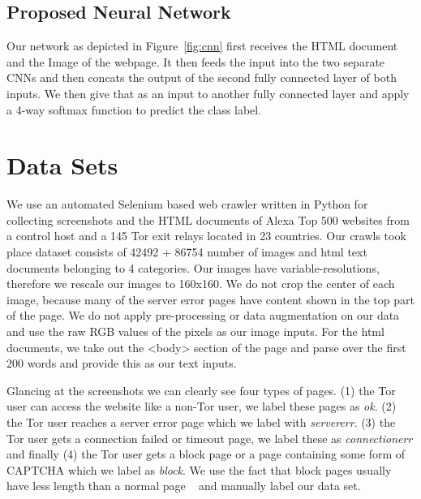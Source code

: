 \documentclass{article} %
\begin{document}
\subsection{Proposed Neural Network}
Our network as depicted in Figure~\ref{fig:cnn} first receives the HTML document and the Image of the webpage. It then feeds the input into the two separate CNNs and then concats the output of the second fully connected layer of both inputs. We then give that as an input to another fully connected layer and apply a 4-way softmax function to predict the class label.

\section{Data Sets}  \label{datasets}
We use an automated Selenium based web crawler written in Python for collecting screenshots and the HTML documents of Alexa Top 500 websites from a control host and a 145 Tor exit relays located in 23 countries. Our crawls took place dataset consists of 42492 + 86754 number of images and html text documents belonging to 4 categories. Our images have variable-resolutions, therefore we rescale our images to 160x160. We do not crop the center of each image, because many of the server error pages have content shown in the top part of the page. We do not apply pre-processing or data augmentation on our data and use the raw RGB values of the pixels as our image inputs. For the html documents, we take out the <body> section of the page and parse over the first 200 words and provide this as our text inputs.

Glancing at the screenshots we can clearly see four types of pages. (1) the Tor user can access the website like a non-Tor user, we label these pages as \textit{ok}. (2) the Tor user reaches a server error page which we label with \textit{servererr}. (3) the Tor user gets a connection failed or timeout page, we label these as \textit{connectionerr} and finally (4) the Tor user gets a block page or a page containing some form of CAPTCHA which we label as \textit{block}. We use the fact that block pages usually have less length than a normal page ~\cite{imc14_phillipa} and manually label our data set.

\clearpage
\end{document}
